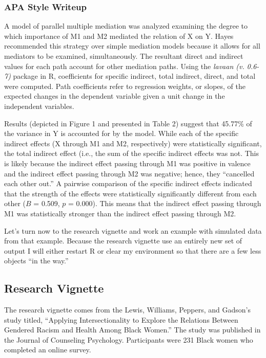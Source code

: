 \documentclass[
  english,
]{book}
\begin{document}
\hypertarget{apa-style-writeup}{%
\subsubsection{APA Style Writeup}\label{apa-style-writeup}}

A model of parallel multiple mediation was analyzed examining the degree to which importance of M1 and M2 mediated the relation of X on Y. Hayes \citeyearpar{hayes_introduction_2018} recommended this strategy over simple mediation models because it allows for all mediators to be examined, simultaneously. The resultant direct and indirect values for each path account for other mediation paths. Using the \emph{lavaan (v. 0.6-7)} package in R, coefficients for specific indirect, total indirect, direct, and total were computed. Path coefficients refer to regression weights, or slopes, of the expected changes in the dependent variable given a unit change in the independent variables.

Results (depicted in Figure 1 and presented in Table 2) suggest that 45.77\% of the variance in Y is accounted for by the model. While each of the specific indirect effects (X through M1 and M2, respectively) were statistically significant, the total indirect effect (i.e., the sum of the specific indirect effects was not. This is likely because the indirect effect passing through M1 was positive in valence and the indirect effect passing through M2 was negative; hence, they ``cancelled each other out.'' A pairwise comparison of the specific indirect effects indicated that the strength of the effects were statistically significantly different from each other (\(B\) = 0.509, \(p\) = 0.000). This means that the indirect effect passing through M1 was statistically stronger than the indirect effect passing through M2.

Let's turn now to the research vignette and work an example with simulated data from that example. Because the research vignette use an entirely new set of output I will either restart R or clear my environment so that there are a few less objects ``in the way.''

\hypertarget{research-vignette-5}{%
\subsection{Research Vignette}\label{research-vignette-5}}

The research vignette comes from the Lewis, Williams, Peppers, and Gadson's \citeyearpar{lewis_applying_2017} study titled, ``Applying Intersectionality to Explore the Relations Between Gendered Racism and Health Among Black Women.'' The study was published in the Journal of Counseling Psychology. Participants were 231 Black women who completed an online survey.
\end{document}
